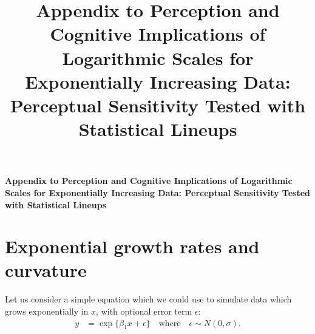 \documentclass[12pt]{article}
\newcommand{\blind}{}
\begin{document}
\def\spacingset#1{\renewcommand{\baselinestretch}%
{#1}\small\normalsize} \spacingset{1}



\blind
{
  \title{\bf Appendix to Perception and Cognitive Implications of
Logarithmic Scales for Exponentially Increasing Data: Perceptual
Sensitivity Tested with Statistical Lineups}

  \author{
      }
  \maketitle
} \fi

\blind
{
  \bigskip
  \bigskip
  \bigskip
  \begin{center}
    {\LARGE\bf Appendix to Perception and Cognitive Implications of
Logarithmic Scales for Exponentially Increasing Data: Perceptual
Sensitivity Tested with Statistical Lineups}
  \end{center}
  \medskip
} \fi

\bigskip

\noindent%
 

\vfill

\newpage
\spacingset{1.9} %

\renewcommand{\thesection}{A}
\setcounter{figure}{0}    
\renewcommand\thefigure{\thesection\arabic{figure}}  
\setcounter{equation}{0}    
\renewcommand\theequation{\thesection\arabic{equation}}

\hypertarget{exponential-growth-rates-and-curvature}{%
\section{Exponential growth rates and
curvature}\label{exponential-growth-rates-and-curvature}}

Let us consider a simple equation which we could use to simulate data
which grows exponentially in \(x\), with optional error term
\(\epsilon\):
\begin{align}y &= \exp\{\beta_1 x + \epsilon\}\quad \text{where}\quad \epsilon \sim N(0, \sigma).\label{eq:simpleexp}\end{align}
\end{document}

